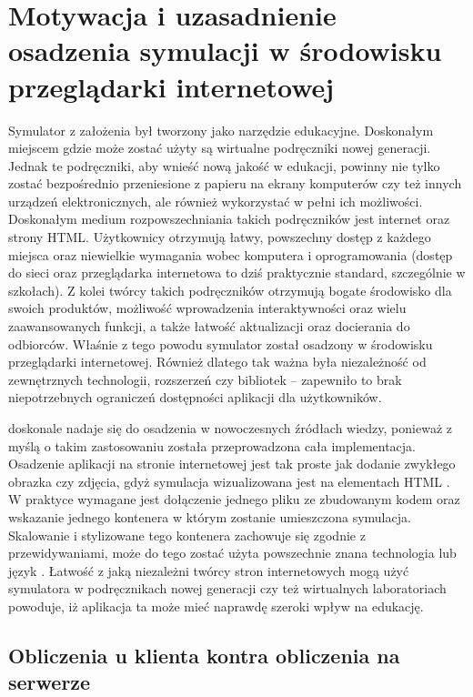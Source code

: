 \section{Motywacja i uzasadnienie osadzenia symulacji w środowisku przeglądarki internetowej}

Symulator \en z założenia był tworzony jako narzędzie edukacyjne. Doskonałym
miejscem gdzie może zostać użyty są wirtualne podręczniki nowej generacji.
Jednak te podręczniki, aby wnieść nową jakość w edukacji, powinny nie tylko
zostać bezpośrednio przeniesione z papieru na ekrany komputerów czy też innych
urządzeń elektronicznych, ale również wykorzystać w pełni ich możliwości.
Doskonałym medium rozpowszechniania takich podręczników jest internet oraz
strony HTML. Użytkownicy otrzymują łatwy, powszechny dostęp z każdego miejsca
oraz niewielkie wymagania wobec komputera i oprogramowania (dostęp do sieci oraz
przeglądarka internetowa to dziś praktycznie standard, szczególnie w szkołach).
Z kolei twórcy takich podręczników otrzymują bogate środowisko dla swoich
produktów, możliwość wprowadzenia interaktywności oraz wielu zaawansowanych
funkcji, a także łatwość aktualizacji oraz docierania do odbiorców.  Właśnie z
tego powodu symulator \en został osadzony w środowisku przeglądarki
internetowej. Również dlatego tak ważna była niezależność od zewnętrznych
technologii, rozszerzeń czy bibliotek -- zapewniło to brak niepotrzebnych
ograniczeń dostępności aplikacji dla użytkowników.

\en doskonale nadaje się do osadzenia w nowoczesnych źródłach wiedzy, ponieważ z
myślą o takim zastosowaniu została przeprowadzona cała implementacja. Osadzenie
aplikacji na stronie internetowej jest tak proste jak dodanie zwykłego obrazka
czy zdjęcia, gdyż symulacja wizualizowana jest na elementach HTML . W
praktyce wymagane jest dołączenie jednego pliku ze zbudowanym kodem \en oraz
wskazanie jednego kontenera  w którym zostanie umieszczona symulacja.
Skalowanie i stylizowane tego kontenera zachowuje się zgodnie z przewidywaniami,
może do tego zostać użyta powszechnie znana technologia  lub język \js.
Łatwość z jaką niezależni twórcy stron internetowych mogą użyć symulatora \en w
podręcznikach nowej generacji czy też wirtualnych laboratoriach powoduje, iż
aplikacja ta może mieć naprawdę szeroki wpływ na edukację.

\subsection{Obliczenia u klienta kontra obliczenia na serwerze}

